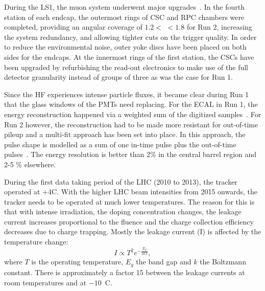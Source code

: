 During the LS1, the  muon system underwent major upgrades~\cite{Guiducci:1966038,Battilana:2239185}. In the fourth station of each endcap, the outermost rings of CSC and RPC chambers were completed, providing an angular coverage of $1.2<$ \abspsrap $<1.8$ for Run 2, increasing the system redundancy, and allowing tighter cuts on the trigger quality. In order to reduce the environmental noise, outer yoke discs have been placed on both sides for the endcaps. 
At the innermost rings of the first station, the CSCs have been upgraded by refurbishing the read-out electronics to make use of the full detector granularity instead of groups of three as was the case for Run 1. 

Since the HF experiences intense particle fluxes, it became clear during Run 1 that the glass windows of the PMTs need replacing. For the ECAL in Run 1, the energy reconstruction happened  via a weighted sum of the digitized samples~\cite{Chatrchyan:2013dga}. For Run 2 however, the reconstruction had to be made more resistant for out-of-time pileup and a multi-fit approach has been set into place. In this approach, the pulse shape is modelled as a sum of one in-time pulse plus the out-of-time pulses~\cite{1748-0221-12-01-C01069}. The energy resolution is better than 2\%  in the central barrel region and 2-5 \% elsewhere.

 During the first data taking period of the LHC (2010 to 2013), the tracker operated at +4\degree C. With the higher LHC beam intensities from 2015 onwards, the tracker needs to be operated at much lower temperatures. The reason for this is that with intense irradiation, the doping concentration changes, the leakage current increases proportional to the fluence and the charge collection efficiency decreases due to charge trapping. Mostly the leakage current (I) is affected by the temperature change: 
\begin{equation}
I \propto T^2 e^{-\frac{E_g}{2kT}}, 
\end{equation}
where $T$ is the operating temperature, $E_g$ the band gap and $k$ the Boltzmann constant. There is approximately a factor 15 between the leakage currents at room temperatures and at $-10$~\degree C. 

